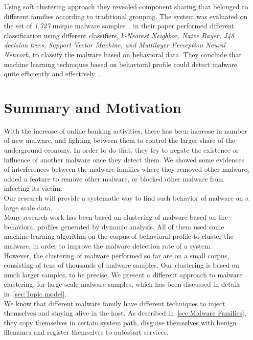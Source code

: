 Using soft clustering approach they revealed component sharing that belonged to different families according to traditional grouping.
The system was evaluated on the set of \emph{1,727} unique malware samples~\cite[]{yavvari}.
\textbf{\citeauthor{firdausi}} in their paper performed different classification using different classifiers, \emph{k-Nearest Neighbor, Naive Bayer, J48 decision trees, Support Vector Machine, and Multilayer Perception Neural Network}, to classify the malware based on behavioral data.
They conclude that machine learning techniques based on behavioral profile could detect malware quite efficiently and effectively~\cite[]{firdausi}.\\
\section{Summary and Motivation}
\label{sec:Motivation}
With the increase of online banking activities, there has been increase in number of new malware, and fighting between them to control the larger share of the underground economy.
In order to do that, they try to negate the existence or influence of another malware once they detect them.
We showed some evidences of interferences between the malware families where they removed other malware, added a feature to remove other malware, or blocked other malware from infecting its victim.\\
Our research will provide a systematic way to find such behavior of malware on a large scale data.
\\
Many research work has been based on clustering of malware based on the behavioral profiles generated by dynamic analysis.
All of them used some machine learning algorithm on the corpus of behavioral profile to cluster the malware, in order to improve the malware detection rate of a system.\\
However, the clustering of malware performed so far are on a small corpus, consisting of tens of thousands of malware samples.
Our clustering is based on much larger samples, {\gettotalmalwarei{}} to be precise.
We present a different approach to malware clustering, for large scale malware samples, which has been discussed in details in~\autoref{sec:Topic model}.\\
We know that different malware family have different techniques to inject themselves and staying alive in the host.
As described in~\autoref{sec:Malware Families}, they copy themselves in certain system path, disguise themselves with benign filenames and register themselves to autostart services.
